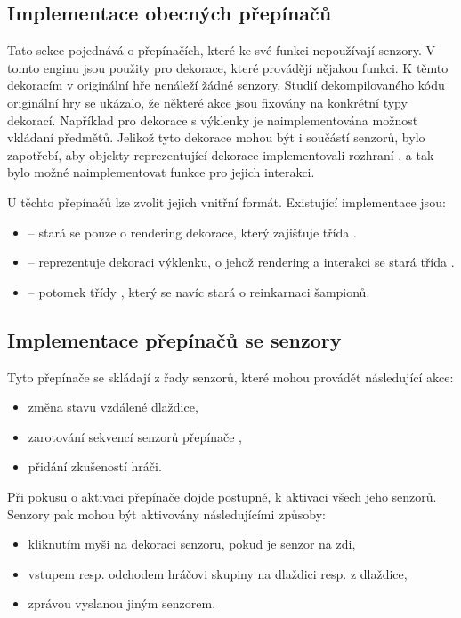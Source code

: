 \subsection{Implementace obecných přepínačů}
Tato sekce pojednává o přepínačích, které ke své funkci nepoužívají senzory. V tomto enginu jsou použity pro 
dekorace, které provádějí nějakou funkci. K těmto dekoracím v originální hře nenáleží žádné senzory. 
Studií dekompilovaného kódu originální hry \cite{DMDecompilation} se ukázalo, že některé akce jsou fixovány 
na konkrétní typy dekorací. Například pro dekorace s výklenky je naimplementována možnost vkládaní předmětů.
Jelikož tyto dekorace mohou být i součástí senzorů, bylo zapotřebí, aby objekty reprezentující dekorace
implementovali rozhraní , a tak bylo možné naimplementovat funkce pro jejich interakci.

U těchto přepínačů lze zvolit jejich vnitřní formát. Existující implementace jsou:
\begin{itemize}
\item {} -- stará se pouze o rendering dekorace, který zajišťuje třída . 
\item {} -- reprezentuje dekoraci výklenku, o jehož rendering a interakci se stará třída . 
\item {} -- potomek třídy , který se navíc stará o reinkarnaci šampionů.
\end{itemize}

\subsection{Implementace přepínačů se senzory}
Tyto přepínače se skládají z řady senzorů, které mohou provádět následující akce:

\begin{itemize}
\item změna stavu vzdálené dlaždice,
\item zarotování sekvencí senzorů přepínače ,
\item přidání zkušeností hráči.
\end{itemize}

Při pokusu o aktivaci přepínače dojde postupně, k aktivaci všech jeho senzorů.
Senzory pak mohou být aktivovány následujícími způsoby:

\begin{itemize}
\item kliknutím myši na dekoraci senzoru, pokud je senzor na zdi, 
\item vstupem resp. odchodem hráčovi skupiny na dlaždici resp. z dlaždice, 
\item zprávou vyslanou jiným senzorem.
\end{itemize}

